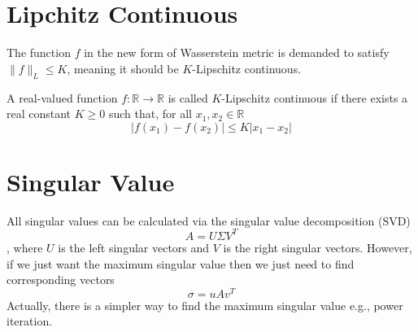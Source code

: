 \begin{appendices}
\section{Lipchitz Continuous}
The function $f$ in the new form of Wasserstein metric is demanded to satisfy $\| f \|_L \leq K$, meaning it should be $K$-Lipschitz continuous.

A real-valued function $f: \mathbb{R} \rightarrow \mathbb{R}$ is called $K$-Lipschitz continuous if there exists a real constant $K\geq 0$ such that, for all $x_1, x_2 \in \mathbb{R}$
$$\lvert f(x_1) - f(x_2) \rvert \leq K \lvert x_1 - x_2 \rvert$$

\section{Singular Value}
All singular values can be calculated via the singular value decomposition (SVD)
$$A = U\Sigma V^T$$
, where $U$ is the left singular vectors and $V$ is the right singular vectors. However, if we just want the maximum singular value then we just need to find corresponding vectors
$$\sigma = uAv^T$$
Actually, there is a simpler way to find the maximum singular value e.g., power iteration. 



\end{appendices}
